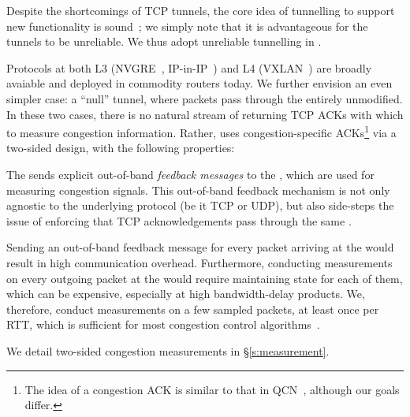 Despite the shortcomings of TCP tunnels, the core idea of tunnelling to support new functionality is sound~\cite{trotsky}; we simply note that it is advantageous for the tunnels to be unreliable. We thus adopt unreliable tunnelling in \name.

 Protocols at both L3 (\eg NVGRE~\cite{nvgre}, IP-in-IP~\cite{ipinip}) and L4 (\eg VXLAN~\cite{vxlan}) are broadly avaiable and deployed in commodity routers today. We further envision an even simpler case: a ``null'' tunnel, where packets pass through the \inbox entirely unmodified.
In these two cases, there is no natural stream of returning TCP ACKs with which to measure congestion information. 
Rather, \name uses congestion-specific ACKs\footnote{The idea of a congestion ACK is similar to that in QCN~\cite{qcn}, although our goals differ.} via a two-sided design, with the following properties:

The \outbox sends explicit out-of-band \emph{feedback messages} to the \inbox, which are used for measuring congestion signals. 
This out-of-band feedback mechanism is not only agnostic to the underlying protocol (be it TCP or UDP), but also side-steps the issue of enforcing that TCP acknowledgements pass through the same \inbox.

 Sending an out-of-band feedback message for every packet arriving at the \outbox would result in high communication overhead. Furthermore, conducting measurements on every outgoing packet at the \inbox would require maintaining state for each of them, which can be expensive, especially at high bandwidth-delay products. We, therefore, conduct measurements on a few sampled packets, at least once per RTT, which is sufficient for most congestion control algorithms~\cite{ccp}. 

We detail two-sided congestion measurements in \S\ref{s:measurement}.
